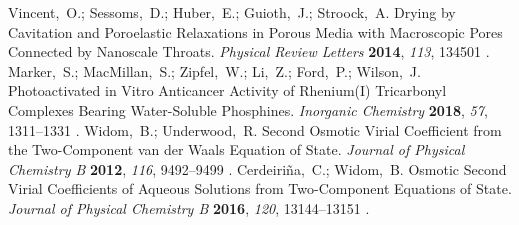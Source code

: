 \documentclass[aps,prl,twocolumn,superscriptaddress,groupedaddress]{revtex4}
\begin{document}
\begin{mcitethebibliography}{15}
\providecommand*\natexlab[1]{#1}
\providecommand*\mciteSetBstSublistMode[1]{}
\providecommand*\mciteSetBstMaxWidthForm[2]{}
\providecommand*\mciteBstWouldAddEndPuncttrue
  {\def\EndOfBibitem{\unskip.}}
\providecommand*\mciteBstWouldAddEndPunctfalse
  {\let\EndOfBibitem\relax}
\providecommand*\mciteSetBstMidEndSepPunct[3]{}
\providecommand*\mciteSetBstSublistLabelBeginEnd[3]{}
\providecommand*\EndOfBibitem{}
\mciteSetBstSublistMode{f}
\mciteSetBstMaxWidthForm{subitem}{(\alph{mcitesubitemcount})}
\mciteSetBstSublistLabelBeginEnd
  {\mcitemaxwidthsubitemform\space}
  {\relax}
  {\relax}

Vincent,~O.; Sessoms,~D.; Huber,~E.; Guioth,~J.; Stroock,~A. Drying by
  Cavitation and Poroelastic Relaxations in Porous Media with Macroscopic Pores
  Connected by Nanoscale Throats. \emph{Physical Review Letters} \textbf{2014},
  \emph{113}, 134501\relax
\mciteBstWouldAddEndPuncttrue
\mciteSetBstMidEndSepPunct{\mcitedefaultmidpunct}
{\mcitedefaultendpunct}{\mcitedefaultseppunct}\relax
\EndOfBibitem
{}
Marker,~S.; MacMillan,~S.; Zipfel,~W.; Li,~Z.; Ford,~P.; Wilson,~J.
  Photoactivated in Vitro Anticancer Activity of Rhenium(I) Tricarbonyl
  Complexes Bearing Water-Soluble Phosphines. \emph{Inorganic Chemistry}
  \textbf{2018}, \emph{57}, 1311--1331\relax
\mciteBstWouldAddEndPuncttrue
\mciteSetBstMidEndSepPunct{\mcitedefaultmidpunct}
{\mcitedefaultendpunct}{\mcitedefaultseppunct}\relax
\EndOfBibitem
{}
Widom,~B.; Underwood,~R. Second Osmotic Virial Coefficient from the
  Two-Component van der Waals Equation of State. \emph{Journal of Physical
  Chemistry B} \textbf{2012}, \emph{116}, 9492--9499\relax
\mciteBstWouldAddEndPuncttrue
\mciteSetBstMidEndSepPunct{\mcitedefaultmidpunct}
{\mcitedefaultendpunct}{\mcitedefaultseppunct}\relax
\EndOfBibitem
{}
Cerdeiri{\~n}a,~C.; Widom,~B. Osmotic Second Virial Coefficients of Aqueous
  Solutions from Two-Component Equations of State. \emph{Journal of Physical
  Chemistry B} \textbf{2016}, \emph{120}, 13144--13151\relax
\mciteBstWouldAddEndPuncttrue
\mciteSetBstMidEndSepPunct{\mcitedefaultmidpunct}
{\mcitedefaultendpunct}{\mcitedefaultseppunct}\relax
\EndOfBibitem
{}

\end{mcitethebibliography}
\end{document}
